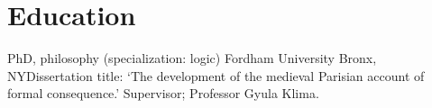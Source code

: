 \section{Education}
{PhD, philosophy (specialization: logic)}
{Fordham University}
{Bronx, NY}{}{Dissertation title: `The development of the medieval Parisian account of formal consequence.' Supervisor; Professor Gyula Klima.}  %
